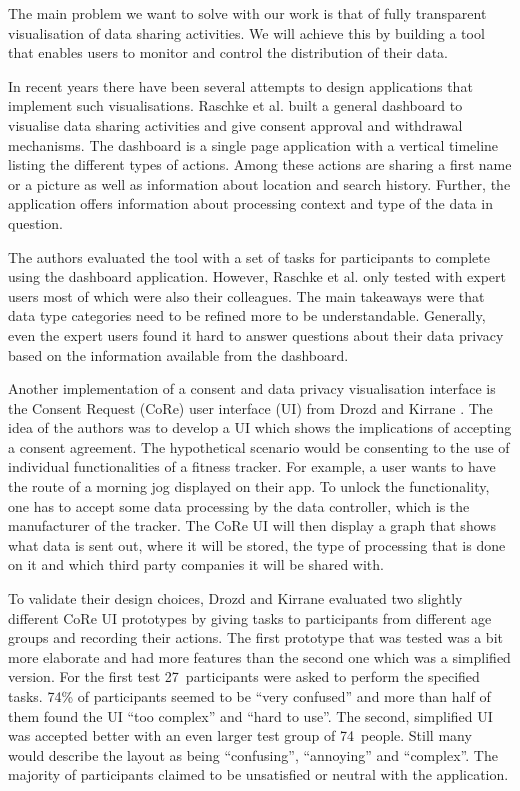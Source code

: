 \documentclass[../paper.tex]{subfiles}
\begin{document}
  The main problem we want to solve with our work is that of fully transparent
  visualisation of data sharing activities. We will achieve this by building a
  tool that enables users to monitor and control the distribution of their
  data.

  In recent years there have been several attempts to design applications that
  implement such visualisations. Raschke et al.
  \cite{core_privacy_dashboard_2018} built a general dashboard to visualise
  data sharing activities and give consent approval and withdrawal mechanisms.
  The dashboard is a single page application with a vertical timeline listing
  the different types of actions. Among these actions are sharing a first name
  or a picture as well as information about location and search history.
  Further, the application offers information about processing context and type
  of the data in question.

  The authors evaluated the tool with a set of tasks for participants to
  complete using the dashboard application. However, Raschke et al.
  \cite{core_privacy_dashboard_2018} only tested with expert users most of which 
  were also their colleagues. The main takeaways were that data type categories
  need to be refined more to be understandable. Generally, even the expert users
  found it hard to answer questions about their data privacy based on the
  information available from the dashboard.

  Another implementation of a consent and data privacy visualisation interface
  is the Consent Request (CoRe) user interface (UI) from Drozd and Kirrane
  \cite{cure2020}.  The idea of the authors was to develop a
  UI which shows the implications of accepting a consent agreement. The
  hypothetical scenario would be consenting to the use of individual
  functionalities of a fitness tracker. For example, a user wants to have the
  route of a morning jog displayed on their app. To unlock the functionality, one
  has to accept some data processing by the data controller, which is the
  manufacturer of the tracker. The CoRe UI \cite{cure2020} will then display a
  graph that shows what data is sent out, where it will be stored, the type of
  processing that is done on it and which third party companies it will be
  shared with.

  To validate their design choices, Drozd and Kirrane evaluated
  two slightly different CoRe UI prototypes by giving tasks to participants
  from different age groups and recording their actions. The first prototype
  that was tested was a bit more elaborate and had more features than the
  second one which was a simplified version. For the first test 27~participants
  were asked to perform the specified tasks. 74\% of participants
  seemed to be “very confused” and more than half of them found the UI “too
  complex” and “hard to use”. The second, simplified UI was accepted better with
  an even larger test group of 74~people. Still many would describe the layout 
  as being “confusing”, “annoying” and “complex”. The majority of participants
  claimed to be unsatisfied or neutral with the application.
  
\end{document}
